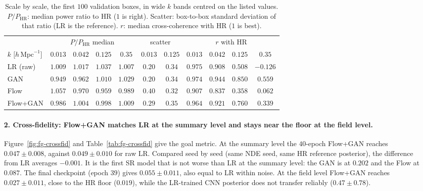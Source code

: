 \begin{table}[t]
\centering
\caption{Scale by scale, the first $100$ validation boxes, in wide $k$ bands
centred on the listed values. $P/P_\text{HR}$: median power
ratio to HR ($1$ is right). Scatter: box-to-box standard deviation of that ratio
(LR is the reference). $r$: median cross-coherence with HR ($1$ is best).}
\label{tab:fg-scale}
\small
\begin{tabular}{l cccc cc cccc}
\toprule
 & \multicolumn{4}{c}{$P/P_\text{HR}$ median} & \multicolumn{2}{c}{scatter} & \multicolumn{4}{c}{$r$ with HR} \\
\cmidrule(lr){2-5}\cmidrule(lr){6-7}\cmidrule(lr){8-11}
$k$ [$h\,\mathrm{Mpc}^{-1}$] & $0.013$ & $0.042$ & $0.125$ & $0.35$ & $0.013$ & $0.125$ & $0.013$ & $0.042$ & $0.125$ & $0.35$ \\
\midrule
LR (raw)  & $1.009$ & $1.017$ & $1.037$ & $1.007$ & $\mathbf{0.20}$ & $0.34$ & $\mathbf{0.975}$ & $0.908$ & $0.508$ & $-0.126$ \\
GAN       & $0.949$ & $0.962$ & $1.010$ & $1.029$ & $\mathbf{0.20}$ & $0.34$ & $0.974$ & $\mathbf{0.944}$ & $\mathbf{0.850}$ & $\mathbf{0.559}$ \\
Flow      & $1.057$ & $0.970$ & $0.959$ & $0.989$ & $0.40$ & $\mathbf{0.32}$ & $0.907$ & $0.837$ & $0.358$ & $0.062$ \\
Flow+GAN  & $\mathbf{0.986}$ & $\mathbf{1.004}$ & $\mathbf{0.998}$ & $\mathbf{1.009}$ & $0.29$ & $0.35$ & $0.964$ & $0.921$ & $0.760$ & $0.339$ \\
\bottomrule
\end{tabular}
\end{table}

\paragraph{2. Cross-fidelity: Flow+GAN matches LR at the summary level and stays near the floor at the field level.}
Figure~\ref{fig:fg-crossfid} and Table~\ref{tab:fg-crossfid} give the goal
metric. At the summary level the $40$-epoch Flow+GAN reaches $0.047\pm0.008$,
against $0.049\pm0.010$ for raw LR. Compared seed by seed (same NDE seed, same HR
reference posterior), the difference from LR averages $-0.001$. It is the first
SR model that is not worse than LR at the summary level: the GAN is at $0.202$
and the Flow at $0.087$. The final checkpoint (epoch $39$) gives $0.055\pm0.011$,
also equal to LR within noise. At the field level Flow+GAN reaches $0.027\pm0.011$,
close to the HR floor ($0.019$), while the LR-trained CNN posterior does not
transfer reliably ($0.47\pm0.78$).

